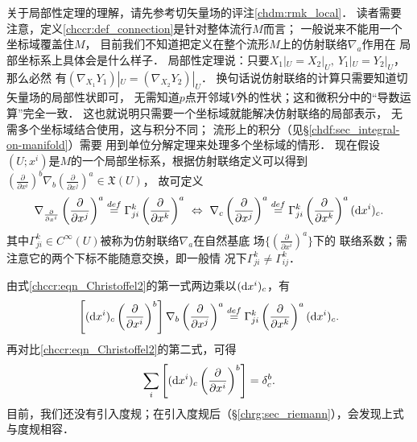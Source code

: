 关于局部性定理的理解，请先参考切矢量场的评注\ref{chdm:rmk_local}．
读者需要注意，定义\ref{chccr:def_connection}是针对整体流行$M$而言；
一般说来不能用一个坐标域覆盖住$M$，
目前我们不知道把定义在整个流形$M$上的仿射联络$\nabla_a$作用在
局部坐标系上具体会是什么样子．
{\kaishu 局部性定理}说：只要$X_1|_U =X_2|_U,\ Y_1|_U =Y_2|_U  $，那么必然
有$(\nabla_{X_1} Y_1) |_U=(\nabla_{X_2} Y_2) |_U$．
换句话说仿射联络的计算只需要知道切矢量场的局部性状即可，
无需知道$p$点开邻域$V$外的性状；这和微积分中的“导数运算”完全一致．
这也就说明只需要一个坐标域就能解决仿射联络的局部表示，
无需多个坐标域结合使用，这与积分不同；
流形上的积分（见\S\ref{chdf:sec_integral-on-manifold}）需要
用到单位分解定理来处理多个坐标域的情形．
现在假设$(U;x^i)$是$M$的一个局部坐标系，根据仿射联络定义可以得到
$(\frac{\partial }{\partial x^i}) ^b \nabla_b(\frac{\partial }{\partial x^j}) ^a \in \mathfrak{X}(U)$，
故可定义
\begin{equation}\label{chccr:eqn_Christoffel2}
    \nabla_{\frac{\partial }{\partial x^i}}
    \left(\frac{\partial }{\partial x^j}\right) ^a \overset{def}{=}
    \Gamma^{k}_{ji} \left(\frac{\partial }{\partial x^k}\right) ^a
      \ \Leftrightarrow \ 
    \nabla_c \left(\frac{\partial }{\partial x^j}\right) ^a \overset{def}{=}
    \Gamma^{k}_{ji} \left(\frac{\partial }{\partial x^k}\right) ^a ({\rm d} x^i)_c .
\end{equation} %
其中$\Gamma^{k}_{ji} \in C^\infty(U)$被称为仿射联络$\nabla_a$在自然基底
场$\{(\frac{\partial }{\partial x^i}) ^a\}$下的
{\heiti 联络系数}；需注意它的两个下标不能随意交换，即一般情
况下$\Gamma^{k}_{ji}\neq \Gamma^{k}_{ij}$．

由式\eqref{chccr:eqn_Christoffel2}的第一式两边乘以$({\rm d} x^i)_c$，有
\begin{equation}
    \left[({\rm d} x^i)_c \left(\frac{\partial }{\partial x^i}\right) ^b\right] \nabla_b
    \left(\frac{\partial }{\partial x^j}\right) ^a \overset{def}{=}
    \Gamma^{k}_{ji} \left(\frac{\partial }{\partial x^k}\right) ^a ({\rm d} x^i)_c .
\end{equation}
再对比\eqref{chccr:eqn_Christoffel2}的第二式，可得
\begin{equation}\label{chccr:eqn_deltaac}
    \sum_i \left[({\rm d} x^i)_c \left(\frac{\partial }{\partial x^i}\right) ^b\right] = \delta_c^b .
\end{equation}
目前，我们还没有引入度规；在引入度规后（\S \ref{chrg:sec_riemann}），会发现上式与度规相容．


